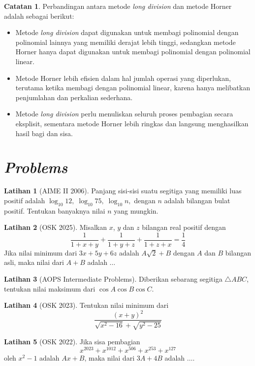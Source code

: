 \documentclass[aspectratio=169]{beamer}
\theoremstyle{definition}
\newtheorem{latihan}{Latihan}
\newtheorem{catatan}{Catatan}
\begin{document}
\begin{frame}{\insertsection}
  \begin{catatan}
    Perbandingan antara metode \textit{long division} dan metode Horner adalah sebagai berikut:
    \begin{itemize}
      \item Metode \textit{long division} dapat digunakan untuk membagi polinomial dengan polinomial lainnya yang memiliki derajat lebih tinggi, sedangkan metode Horner hanya dapat digunakan untuk membagi polinomial dengan polinomial linear.
      \item Metode Horner lebih efisien dalam hal jumlah operasi yang diperlukan, terutama ketika membagi dengan polinomial linear, karena hanya melibatkan penjumlahan dan perkalian sederhana.
      \item Metode \textit{long division} perlu menuliskan seluruh proses pembagian secara eksplisit, sementara metode Horner lebih ringkas dan langsung menghasilkan hasil bagi dan sisa.
    \end{itemize}
  \end{catatan}
\end{frame}

\section*{\textit{Problems}}
\begin{frame}{\insertsection}
  \begin{latihan}[AIME II 2006]
    Panjang sisi-sisi suatu segitiga yang memiliki luas positif adalah
    $
      \log_{10} 12,\; \log_{10} 75,\; \log_{10} n,
    $
    dengan \(n\) adalah bilangan bulat positif. Tentukan banyaknya nilai \(n\) yang mungkin.
  \end{latihan}
  \begin{latihan}[OSK 2025]
    Misalkan \(x\), \(y\) dan \(z\) bilangan real positif dengan
    \[
      \frac{1}{1+x+y}+\frac{1}{1+y+z}+\frac{1}{1+z+x}=\frac14
    \]
    Jika nilai minimum dari \(3x+5y+6z\) adalah \(A\sqrt2+B\) dengan \(A\) dan \(B\) bilangan asli, maka nilai dari \(A+B\) adalah \(\ldots\)
  \end{latihan}
\end{frame}

\begin{frame}{\insertsection}
  \begin{latihan}[AOPS Intermediate Problems]
    Diberikan sebarang segitiga $\triangle ABC$, tentukan nilai maksimum dari $\cos A \cos B \cos C$.
  \end{latihan}
  \begin{latihan}[OSK 2023]
    Tentukan nilai minimum dari
    \[
      \frac{(x + y)^2}{\sqrt{x^2 - 16} + \sqrt{y^2 - 25}}
    \]

  \end{latihan}
  \begin{latihan}[OSK 2022]
    Jika sisa pembagian
    \[
      x^{2023}+x^{1012}+x^{506}+x^{253}+x^{127}
    \]
    oleh \(x^2-1\) adalah \(Ax+B\), maka nilai dari \(3A+4B\) adalah \(\ldots\).
  \end{latihan}
\end{frame}
\end{document}
